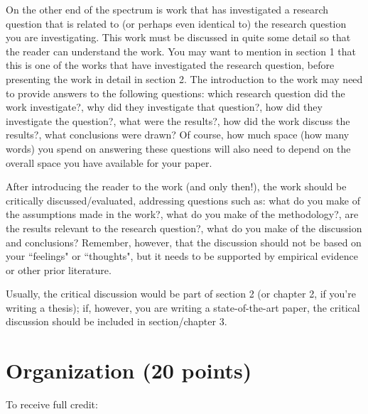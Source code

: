 \documentclass[11pt,fleqn,a4paper/thesis]{article}
\newcommand{\6}{\mbox{$[\hspace*{-.6mm}[$}}
\newcommand{\9}{\mbox{$]\hspace*{-.6mm}]$}}
\begin{document}
\begin{itemize}[itemsep=-1pt,leftmargin=2.5ex,topsep=-2pt]
\begin{enumerate}
On the other end of the spectrum is work that has investigated a research question that is related to (or perhaps even identical to) the research question you are investigating. This work must be discussed in quite some detail so that the reader can understand the work. You may want to mention in section 1 that this is one of the works that have investigated the research question, before presenting the work in detail in section 2. The introduction to the work may need to provide answers to the following questions: which research question did the work investigate?, why did they investigate that question?, how did they investigate the question?, what were the results?, how did the work discuss the results?, what conclusions were drawn? Of course, how much space (how many words) you spend on answering these questions will also need to depend on the overall space you have available for your paper. 

\end{enumerate}


After introducing the reader to the work (and only then!), the work should be critically discussed/evaluated, addressing questions such as: what do you make of the assumptions made in the work?, what do you make of the methodology?, are the results relevant to the research question?, what do you make of the discussion and conclusions? Remember, however, that the discussion should not be based on your ``feelings" or ``thoughts", but it needs to be supported by empirical evidence or other prior literature. 

Usually, the critical discussion would be part of section 2 (or chapter 2, if you're writing a thesis); if, however, you are writing a state-of-the-art paper, the critical discussion should be included in section/chapter 3. 

\end{itemize}

\section{Organization (20 points)}

To receive full credit:
\end{document}
